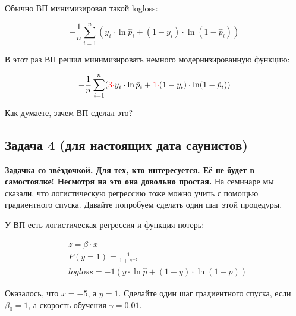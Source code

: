 \documentclass[12pt, a4paper, oneside]{article}
\begin{document}
Обычно ВП минимизировал такой logloss: 

$$
- \frac{1}{n} \sum_{i=1}^n (y_i \cdot \ln \hat p_i + (1 - y_i) \cdot \ln( 1 - \hat p_i)) 
$$

В этот раз ВП решил минимизировать немного модернизированную функцию: 

$$
- \frac{1}{n} \sum_{i=1}^n ({\color{red} 3 \cdot} y_i \cdot \ln \hat p_i + {\color{red} 1 \cdot} (1 - y_i) \cdot \ln( 1 - \hat p_i)) 
$$

Как думаете, зачем ВП сделал это? 



\subsection*{Задача 4 (для настоящих дата саунистов)}

\textbf{Задачка со звёздочкой. Для тех, кто интересуется. Её не будет в самостоялке! Несмотря на это она довольно простая.} На семинаре мы сказали, что логистическую регрессию тоже можно учить с помощью градиентного спуска. Давайте попробуем сделать один шаг этой процедуры. 

У ВП есть логистическая регрессия и функция потерь: 

\begin{equation*}
\begin{aligned}
&z  = \beta \cdot x \\
&P(y = 1) = \frac{1}{1 + e^{-z}} \\
&logloss = -1 (y \cdot \ln \hat p + (1 - y) \cdot \ln (1 - p))
\end{aligned}
\end{equation*}

Оказалось, что $x = -5$, а $y = 1$. Сделайте один шаг градиентного спуска, если $\beta_0 = 1$, а скорость обучения $\gamma = 0.01$. 
\end{document}
